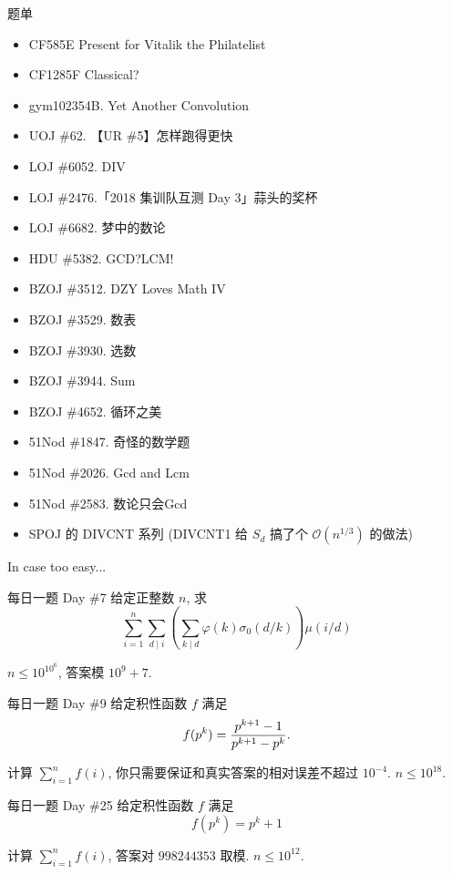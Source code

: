 \documentclass{beamer}
\begin{document}
    \begin{frame}{题单}
        \begin{itemize}
            \item CF585E Present for Vitalik the Philatelist
            \item CF1285F Classical?
            \item gym102354B. Yet Another Convolution
            \item UOJ \#62. 【UR \#5】怎样跑得更快
            \item LOJ \#6052. DIV
            \item LOJ \#2476.「2018 集训队互测 Day 3」蒜头的奖杯
            \item LOJ \#6682. 梦中的数论
            \item HDU \#5382. GCD?LCM!
            \item BZOJ \#3512. DZY Loves Math IV
            \item BZOJ \#3529. 数表
            \item BZOJ \#3930. 选数
            \item BZOJ \#3944. Sum
            \item BZOJ \#4652. 循环之美
            \item 51Nod \#1847. 奇怪的数学题
            \item 51Nod \#2026. Gcd and Lcm
            \item 51Nod \#2583. 数论只会Gcd
            \item SPOJ 的 DIVCNT 系列 (DIVCNT1 给 $S_d$ 搞了个 $\mathcal O(n^{1/3})$ 的做法)
        \end{itemize}
    \end{frame}

    \begin{frame}{In case too easy...}
        \begin{block}{每日一题 Day \#7}
            给定正整数 $n$, 求
            $$
            \sum_{i=1}^n\sum_{d\mid i}\left(\sum_{k\mid d}\varphi(k)\sigma_0(d/k)\right)\mu(i/d)
            $$

            $n\leq 10^{10^6}$, 答案模 $10^9+7$.
        \end{block}
        \begin{block}{每日一题 Day \#9}
            给定积性函数 $f$ 满足
            $$
            f(p^k)={p^{k+1}-1\over p^{k+1}-p^k}.
            $$

            计算 $\sum_{i=1}^n f(i)$, 你只需要保证和真实答案的相对误差不超过 $10^{-4}$. $n\leq 10^{18}$.
        \end{block}
        \begin{block}{每日一题 Day \#25}
            给定积性函数 $f$ 满足
            $$
            f(p^k)=p^k+1
            $$

            计算 $\sum_{i=1}^n f(i)$, 答案对 $998244353$ 取模. $n\leq 10^{12}$.
        \end{block}
    \end{frame}
\end{document}
